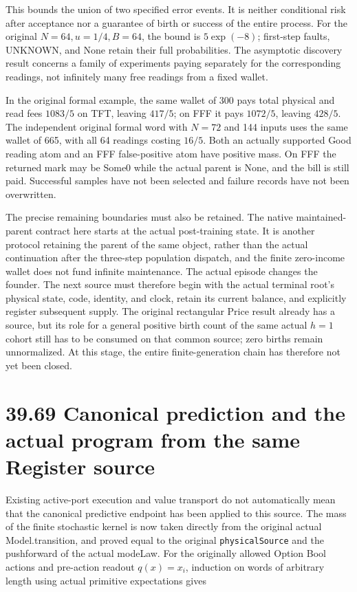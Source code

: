 \documentclass[
  english,
  11pt,
  oneside]{book}
\begin{document}
This bounds the union of two specified error events. It is neither conditional risk after acceptance nor a guarantee of birth or success of the entire process. For the original \(N=64,u=1/4,B=64\), the bound is \(5\exp(-8)\); first-step faults, UNKNOWN, and None retain their full probabilities. The asymptotic discovery result concerns a family of experiments paying separately for the corresponding readings, not infinitely many free readings from a fixed wallet.

In the original formal example, the same wallet of 300 pays total physical and read fees \(1083/5\) on TFT, leaving \(417/5\); on FFF it pays \(1072/5\), leaving \(428/5\). The independent original formal word with \(N=72\) and 144 inputs uses the same wallet of 665, with all 64 readings costing \(16/5\). Both an actually supported Good reading atom and an FFF false-positive atom have positive mass. On FFF the returned mark may be Some0 while the actual parent is None, and the bill is still paid. Successful samples have not been selected and failure records have not been overwritten.

The precise remaining boundaries must also be retained. The native maintained-parent contract here starts at the actual post-training state. It is another protocol retaining the parent of the same object, rather than the actual continuation after the three-step population dispatch, and the finite zero-income wallet does not fund infinite maintenance. The actual episode changes the founder. The next source must therefore begin with the actual terminal root's physical state, code, identity, and clock, retain its current balance, and explicitly register subsequent supply. The original rectangular Price result already has a source, but its role for a general positive birth count of the same actual \(h=1\) cohort still has to be consumed on that common source; zero births remain unnormalized. At this stage, the entire finite-generation chain has therefore not yet been closed.

\section{39.69 Canonical prediction and the actual program from the same Register source}\label{canonical-prediction-and-the-actual-program-from-the-same-register-source}

Existing active-port execution and value transport do not automatically mean that the canonical predictive endpoint has been applied to this source. The mass of the finite stochastic kernel is now taken directly from the original actual Model.transition, and proved equal to the original \nolinkurl{physicalSource} and the pushforward of the actual modeLaw. For the originally allowed Option Bool actions and pre-action readout \(q(x)=x_i\), induction on words of arbitrary length using actual primitive expectations gives
\end{document}
